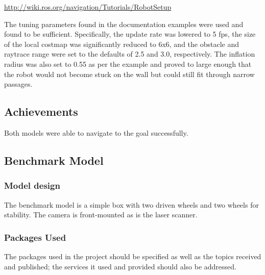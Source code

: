 \documentclass[10pt,journal,compsoc]{IEEEtran}
\begin{document}
\url{http://wiki.ros.org/navigation/Tutorials/RobotSetup}

The tuning parameters found in the documentation examples were used and found to be sufficient. Specifically, the update rate was lowered to 5 fps, the size of the local costmap was significantly reduced to 6x6, and the obstacle and raytrace range were set to the defaults of 2.5 and 3.0, respectively. The inflation radius was also set to 0.55 as per the example and proved to large enough that the robot would not become stuck on the wall but could still fit through narrow passages.

\subsection{Achievements}
Both models were able to navigate to the goal successfully.

\subsection{Benchmark Model}
\subsubsection{Model design}
The benchmark model is a simple box with two driven wheels and two wheels for stability. The camera is front-mounted as is the laser scanner.
\subsubsection{Packages Used}
The packages used in the project should be specified as well as the topics received and published; the services it used and provided should also be addressed.
\end{document}
